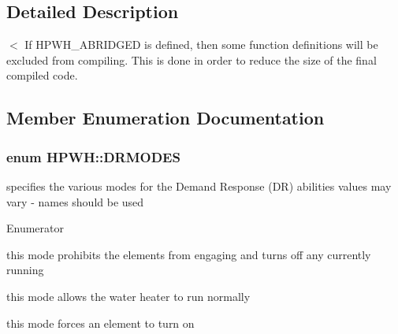 \subsection{Detailed Description}
$<$ If H\-P\-W\-H\-\_\-\-A\-B\-R\-I\-D\-G\-E\-D is defined, then some function definitions will be excluded from compiling. This is done in order to reduce the size of the final compiled code. 

\subsection{Member Enumeration Documentation}
\hypertarget{class_h_p_w_h_a6a74814715ed6a33a75fd0d9dc3e7107}{
\subsubsection[{D\-R\-M\-O\-D\-E\-S}]{\setlength{\rightskip}{0pt plus 5cm}enum {\bf H\-P\-W\-H\-::\-D\-R\-M\-O\-D\-E\-S}}}\label{class_h_p_w_h_a6a74814715ed6a33a75fd0d9dc3e7107}
specifies the various modes for the Demand Response (D\-R) abilities values may vary -\/ names should be used \begin{Desc}
\item[Enumerator]\par
\begin{description}
\item[{\em 
\hypertarget{class_h_p_w_h_a6a74814715ed6a33a75fd0d9dc3e7107acb6ede5bfedbd26d1e1021c1dfeaaea8}{D\-R\-\_\-\-B\-L\-O\-C\-K}\label{class_h_p_w_h_a6a74814715ed6a33a75fd0d9dc3e7107acb6ede5bfedbd26d1e1021c1dfeaaea8}
}]this mode prohibits the elements from engaging and turns off any currently running \item[{\em 
\hypertarget{class_h_p_w_h_a6a74814715ed6a33a75fd0d9dc3e7107a3ad0a53f7db054449c523c96107a820a}{D\-R\-\_\-\-A\-L\-L\-O\-W}\label{class_h_p_w_h_a6a74814715ed6a33a75fd0d9dc3e7107a3ad0a53f7db054449c523c96107a820a}
}]this mode allows the water heater to run normally \item[{\em 
\hypertarget{class_h_p_w_h_a6a74814715ed6a33a75fd0d9dc3e7107ac7a7e433da8920f98289ecd6b3246a6a}{D\-R\-\_\-\-E\-N\-G\-A\-G\-E}\label{class_h_p_w_h_a6a74814715ed6a33a75fd0d9dc3e7107ac7a7e433da8920f98289ecd6b3246a6a}
}]this mode forces an element to turn on \end{description}
\end{Desc}
